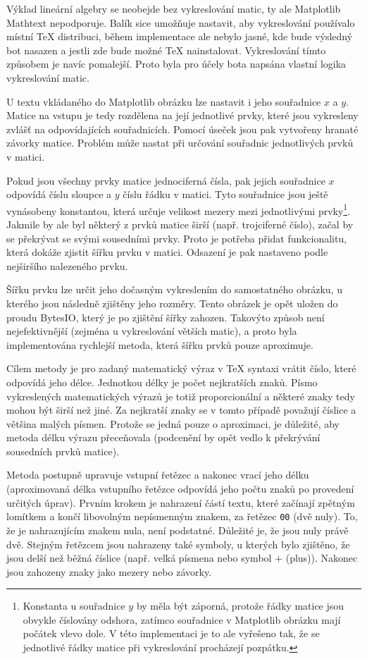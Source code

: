 \documentclass[FM]{tulthesis}
\begin{document}
	Výklad lineární algebry se neobejde bez vykreslování matic, ty ale Matplotlib Mathtext nepodporuje. Balík sice umožňuje nastavit, aby vykreslování používalo místní TeX distribuci, během implementace ale nebylo jasné, kde bude výsledný bot nasazen a jestli zde bude možné TeX nainstalovat. Vykreslování tímto způsobem je navíc pomalejší. Proto byla pro účely bota napsána vlastní logika vykreslování matic.
	
	U textu vkládaného do Matplotlib obrázku lze nastavit i jeho souřadnice $x$ a $y$. Matice na vstupu je tedy rozdělena na její jednotlivé prvky, které jsou vykresleny zvlášť na odpovídajících souřadnicích. Pomocí úseček jsou pak vytvořeny hranaté závorky matice. Problém může nastat při určování souřadnic jednotlivých prvků v matici.
	
	Pokud jsou všechny prvky matice jednociferná čísla, pak jejich souřadnice $x$ odpovídá číslu sloupce a $y$ číslu řádku v matici. Tyto souřadnice jsou ještě vynásobeny konstantou, která určuje velikost mezery mezi jednotlivými prvky\footnote{Konstanta u souřadnice $y$ by měla být záporná, protože řádky matice jsou obvykle číslovány odshora, zatímco souřadnice v Matplotlib obrázku mají počátek vlevo dole. V této implementaci je to ale vyřešeno tak, že se jednotlivé řádky matice při vykreslování procházejí pozpátku.}. Jakmile by ale byl některý z prvků matice širší (např. trojciferné číslo), začal by se překrývat se svými sousedními prvky. Proto je potřeba přidat funkcionalitu, která dokáže zjistit šířku prvku v matici. Odsazení je pak nastaveno podle nejširšího nalezeného prvku.
	
	Šířku prvku lze určit jeho dočasným vykreslením do samostatného obrázku, u kterého jsou následně zjištěny jeho rozměry. Tento obrázek je opět uložen do proudu BytesIO, který je po zjištění šířky zahozen. Takovýto způsob není nejefektivnější (zejména u vykreslování větších matic), a proto byla implementována rychlejší metoda, která šířku prvků pouze aproximuje.

	Cílem metody je pro zadaný matematický výraz v TeX syntaxi vrátit číslo, které odpovídá jeho délce. Jednotkou délky je počet nejkratších znaků. Písmo vykreslených matematických výrazů je totiž proporcionální a některé znaky tedy mohou být širší než jiné. Za nejkratší znaky se v tomto případě považují číslice a většina malých písmen. Protože se jedná pouze o aproximaci, je důležité, aby metoda délku výrazu přeceňovala (podcenění by opět vedlo k překrývání sousedních prvků matice).
	
	Metoda postupně upravuje vstupní řetězec a nakonec vrací jeho délku (aproximovaná délka vstupního řetězce odpovídá jeho počtu znaků po provedení určitých úprav). Prvním krokem je nahrazení částí textu, které začínají zpětným lomítkem a končí libovolným nepísmenným znakem, za řetězec \verb*|00| (dvě nuly). To, že je nahrazujícím znakem nula, není podstatné. Důležité je, že jsou nuly právě dvě. Stejným řetězcem jsou nahrazeny také symboly, u kterých bylo zjištěno, že jsou delší než běžná číslice (např. velká písmena nebo symbol $+$ (plus)). Nakonec jsou zahozeny znaky jako mezery nebo závorky. %
	
\end{document}
